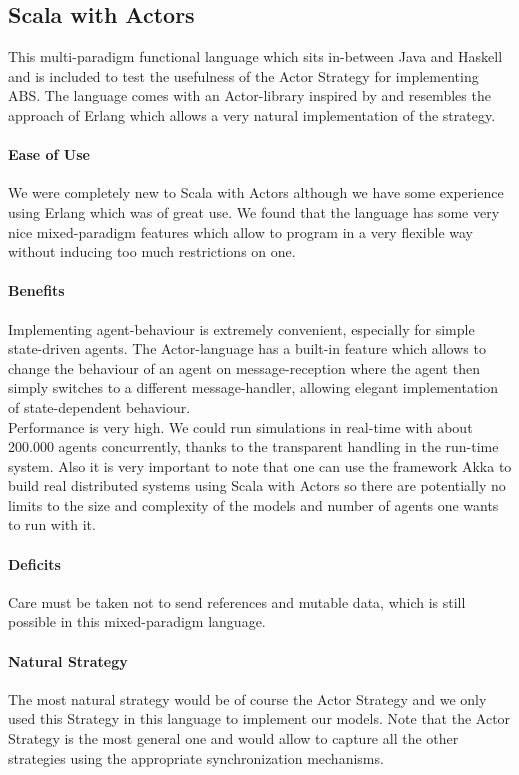 \subsection{Scala with Actors}
This multi-paradigm functional language which sits in-between Java and Haskell and is included to test the usefulness of the Actor Strategy for implementing ABS. The language comes with an Actor-library inspired by \cite{agha_actors:_1986} and resembles the approach of Erlang which allows a very natural implementation of the strategy.

\paragraph{Ease of Use}
We were completely new to Scala with Actors although we have some experience using Erlang which was of great use. We found that the language has some very nice mixed-paradigm features which allow to program in a very flexible way without inducing too much restrictions on one.

\paragraph{Benefits}
Implementing agent-behaviour is extremely convenient, especially for simple state-driven agents. The Actor-language has a built-in feature which allows to change the behaviour of an agent on message-reception where the agent then simply switches to a different message-handler, allowing elegant implementation of state-dependent behaviour. \\

Performance is very high. We could run simulations in real-time with about 200.000 agents concurrently, thanks to the transparent handling in the run-time system. Also it is very important to note that one can use the framework Akka to build real distributed systems using Scala with Actors so there are potentially no limits to the size and complexity of the models and number of agents one wants to run with it.

\paragraph{Deficits}
Care must be taken not to send references and mutable data, which is still possible in this mixed-paradigm language.

\paragraph{Natural Strategy}
The most natural strategy would be of course the Actor Strategy and we only used this Strategy in this language to implement our models. Note that the Actor Strategy is the most general one and would allow to capture all the other strategies using the appropriate synchronization mechanisms.



